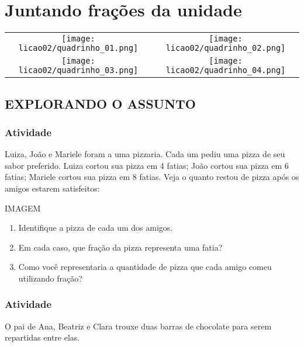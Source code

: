 
\setcounter{chapter}{1}
\setcounter{subsection}{0}
\chapter{Juntando frações da unidade }
\vspace*{-1.3cm}


\hspace*{-1.3cm}\begin{tabular}{cc}
 \texttt{[image: licao02/quadrinho\_01.png]}   & \texttt{[image: licao02/quadrinho\_02.png]}   \\
 \texttt{[image: licao02/quadrinho\_03.png]} & \texttt{[image: licao02/quadrinho\_04.png]}
\end{tabular}


\clearpage

\section{EXPLORANDO O ASSUNTO }

\subsection{Atividade}

Luiza, João e Mariele foram a uma pizzaria. Cada um pediu uma pizza de seu sabor preferido. 
Luiza cortou sua pizza em 4 fatias; João cortou sua pizza em 6 fatias; Mariele cortou sua pizza em 8 fatias.
Veja o quanto restou de pizza após os amigos estarem satisfeitos:

IMAGEM

\begin{enumerate} [\quad a)] %
\item   Identifique a pizza de cada um dos amigos.
\item   Em cada caso, que fração da pizza representa uma fatia?
\item   Como você representaria a quantidade de pizza que cada amigo comeu utilizando fração?
\end{enumerate}
 


\subsection{Atividade}

O pai de Ana, Beatriz e Clara trouxe duas barras de chocolate para serem repartidas entre elas.

